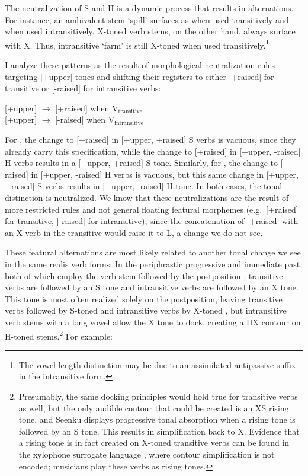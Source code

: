 \documentclass[output=paper]{langsci/langscibook}
\begin{document}
The neutralization of S and H is a dynamic process that results in alternations. For instance, an ambivalent stem {\it {}} `spill' surfaces as {\it {}} when used transitively and {\it {}} when used intransitively. X-toned verb stems, on the other hand, always surface with X. Thus, intransitive {\it {}} `farm' is still X-toned {\it {}} when used transitively.\footnote{The vowel length distinction may be due to an assimilated antipassive suffix in the intransitive form.}

I analyze these patterns as the result of morphological neutralization rules targeting [+upper] tones and shifting their registers to either [+raised] for transitive or [-raised] for intransitive verbs:

\ea\label{ex:mcpherson:13} 
\ea\label{ex:mcpherson:13a} {[}+upper] $\rightarrow$ [+raised] when V$_{\text{transitive}}$ \\
\ex\label{ex:mcpherson:13b} {[}+upper] $\rightarrow$ [-raised] when V$_{\text{intransitive}}$ \\ 
\z
\z

For , the change to [+raised] in [+upper, +raised] S verbs is vacuous, since they already carry this specification, while the change to [+raised] in [+upper, \mbox{-raised]} H verbs results in a [+upper, +raised] S tone. Similarly, for , the change to [-raised] in [+upper, -raised] H verbs is vacuous, but this same change in [+upper, +raised] S verbs results in [+upper, -raised] H tone. In both cases, the tonal distinction is neutralized. We know that these neutralizations are the result of more restricted rules and not general floating featural morphemes (e.g.\ [+raised] for transitive, [-raised] for intransitive), since the concatenation of [+raised] with an X verb in the transitive would raise it to L, a change we do not see.

These featural alternations are most likely related to another tonal change we see in the same realis verb forms: In the periphrastic progressive and immediate past, both of which employ the verb stem followed by the postposition {\it {}}, transitive verbs are followed by an S tone and intransitive verbs are followed by an X tone. This tone is most often realized solely on the postposition, leaving transitive verbs followed by S-toned {\it {}} and intransitive verbs by X-toned {\it {}}, but intransitive verb stems with a long vowel allow the X tone to dock, creating a HX contour on H-toned stems.\footnote{Presumably, the same docking principles would hold true for transitive verbs as well, but the only audible contour that could be created is an XS rising tone, and Seenku displays progressive tonal absorption \citep{HymanSchuh74} when a rising tone is followed by an S tone. This results in simplification back to X. Evidence that a rising tone is in fact created on X-toned transitive verbs can be found in the xylophone surrogate language \citep{McPherson16}, where contour simplification is not encoded; musicians play these verbs as rising tones.} For example:
\end{document}

